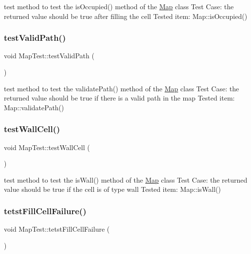 test method to test the is\+Occupied() method of the \hyperlink{classMap}{Map} class Test Case\+: the returned value should be true after filling the cell Tested item\+: Map\+::is\+Occupied() \hypertarget{classMapTest_ae7a28d196c97101aa248a326af2a3f5b}{}\label{classMapTest_ae7a28d196c97101aa248a326af2a3f5b} 
\subsubsection{\texorpdfstring{test\+Valid\+Path()}{testValidPath()}}
{\footnotesize\ttfamily void Map\+Test\+::test\+Valid\+Path (\begin{DoxyParamCaption}{ }\end{DoxyParamCaption})\hspace{0.3cm}{\ttfamily [protected]}}

test method to test the validate\+Path() method of the \hyperlink{classMap}{Map} class Test Case\+: the returned value should be true if there is a valid path in the map Tested item\+: Map\+::validate\+Path() \hypertarget{classMapTest_a577057c71af12efac9f1d6878bf85d01}{}\label{classMapTest_a577057c71af12efac9f1d6878bf85d01} 
\subsubsection{\texorpdfstring{test\+Wall\+Cell()}{testWallCell()}}
{\footnotesize\ttfamily void Map\+Test\+::test\+Wall\+Cell (\begin{DoxyParamCaption}{ }\end{DoxyParamCaption})\hspace{0.3cm}{\ttfamily [protected]}}

test method to test the is\+Wall() method of the \hyperlink{classMap}{Map} class Test Case\+: the returned value should be true if the cell is of type wall Tested item\+: Map\+::is\+Wall() \hypertarget{classMapTest_a3e9eca91fbec359042f7287d378a3534}{}\label{classMapTest_a3e9eca91fbec359042f7287d378a3534} 
\subsubsection{\texorpdfstring{tetst\+Fill\+Cell\+Failure()}{tetstFillCellFailure()}}
{\footnotesize\ttfamily void Map\+Test\+::tetst\+Fill\+Cell\+Failure (\begin{DoxyParamCaption}{ }\end{DoxyParamCaption})\hspace{0.3cm}{\ttfamily [protected]}}

